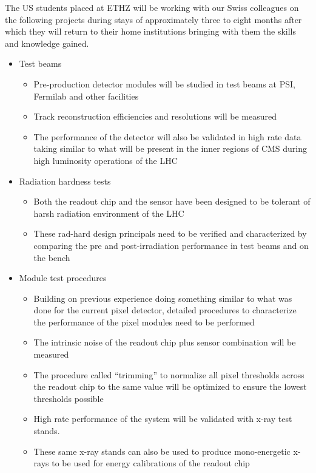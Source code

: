 The US students placed at ETHZ will be working with our Swiss
colleagues on the following projects during stays of approximately
three to eight months after which they will return to their home institutions
bringing with them the skills and knowledge gained.
\begin{itemize}
\item Test beams
  \begin{itemize}
  \item Pre-production detector modules will be studied in test beams
    at PSI, Fermilab and other facilities
  \item Track reconstruction efficiencies and resolutions will be
    measured
  \item The performance of the detector will also be validated in high
    rate data taking similar to what will be present in the inner
    regions of CMS during high luminosity operations of the LHC
  \end{itemize}
\item Radiation hardness tests
  \begin{itemize}
  \item Both the readout chip and the sensor have been designed to be
    tolerant of harsh radiation environment of the LHC
  \item These rad-hard design principals need to be verified and
    characterized by comparing the pre and post-irradiation
    performance in test beams and on the bench
  \end{itemize}
\item Module test procedures
  \begin{itemize}
  \item Building on previous experience doing something similar to
    what was done for the current pixel detector, detailed procedures
    to characterize the performance of the pixel modules need to be performed
  \item The intrinsic noise of the readout chip plus sensor
    combination will be measured
  \item The procedure called ``trimming'' to normalize all pixel
    thresholds across the readout chip to the same value will be
    optimized to ensure the lowest thresholds possible
  \item High rate performance of the system will be validated with
    x-ray test stands.
  \item These same x-ray stands can also be used to produce
    mono-energetic x-rays to be used for energy calibrations of the
    readout chip
  \end{itemize}
\end{itemize}

